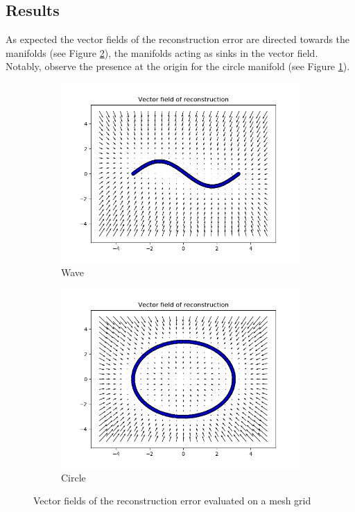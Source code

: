 \subsection*{Results}
As expected the vector fields of the reconstruction error are directed towards the manifolds (see Figure \ref{fig:exp1-vector-fields}), the manifolds acting as sinks in the vector field. Notably, observe the presence at the origin for the circle manifold (see Figure \ref{fig:exp1-vf-circle}).
\begin{figure}[!h]
\centering
\begin{subfigure}{.5\textwidth}
  \centering
  \includegraphics[width=.95\linewidth]{figures/wave-vector-field}
  \caption{Wave}
\end{subfigure}%
\begin{subfigure}{.5\textwidth}
  \centering
  \includegraphics[width=.95\linewidth]{figures/circle-vector-field}
  \caption{Circle}
  \label{fig:exp1-vf-circle}
\end{subfigure}
\caption[Vector fields on wave and circle manifold]{Vector fields of the reconstruction error evaluated on a mesh grid}
\label{fig:exp1-vector-fields}
\end{figure}

